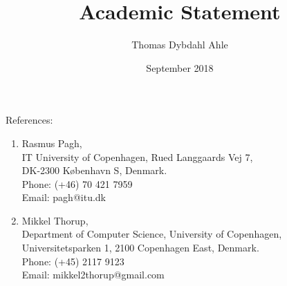 \documentclass[10pt]{article}
\title{Academic Statement}
\author{Thomas Dybdahl Ahle}
\date{September 2018}
\begin{document}
References:
\begin{enumerate}
   \item
Rasmus Pagh,\\
IT University of Copenhagen,
Rued Langgaards Vej 7,\\
DK-2300 København S,
Denmark.\\
Phone: (+46) 70 421 7959\\
Email: pagh@itu.dk
   \item
Mikkel Thorup,\\
Department of Computer Science,
University of Copenhagen,\\
Universitetsparken 1,
2100 Copenhagen East, Denmark.\\
Phone: (+45) 2117 9123\\
Email: mikkel2thorup@gmail.com
\end{enumerate}
\end{document}
